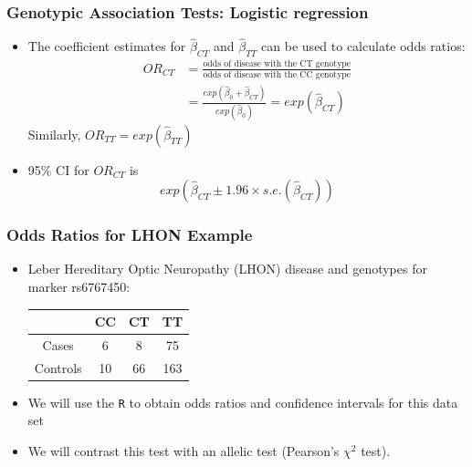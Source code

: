 \documentclass{beamer}
\begin{document}
\begin{frame}
\frametitle{\bf Genotypic Association Tests: Logistic regression }
\begin{itemize}

\item The coefficient estimates for $\hat{\beta}_{CT}$ and $\hat{\beta}_{TT}$ can be used to calculate odds ratios:
\begin{align*}
	OR_{CT} &=\frac{\mbox{odds of disease with the CT genotype}}{\mbox{odds of disease with the CC genotype}} \\
	& = \frac{exp(\hat{\beta} _0  + \hat{\beta}_{CT})}{exp(\hat{\beta}_0 )}
	= exp(\hat{\beta}_{CT})
\end{align*}
Similarly, $OR_{TT}=exp(\hat{\beta}_{TT}) $
\item 95\% CI for $OR_{CT}$ is
\[ exp(\hat{\beta}_{CT} \pm 1.96\times s.e.(\hat{\beta}_{CT})) \]
\end{itemize}
\end{frame}

\begin{frame}
\frametitle{\bf Odds Ratios for LHON Example }

\begin{itemize}
\item Leber Hereditary Optic Neuropathy (LHON) disease and genotypes for marker rs6767450:\\

    \begin{center}
      \begin{tabular}{|c|c|c|c|}
        \hline
         & CC & CT & TT\\
 \hline
  Cases & 6 & 8 &75 \\
  \hline
  Controls& 10&66& 163\\
 \hline
      \end{tabular}
    \end{center}

\item We will use the \texttt{R} to obtain odds ratios and confidence intervals for this data set 
\item We will contrast this test with an allelic test (Pearson's $\chi^2$ test).
\end{itemize}



\end{frame}
\end{document}
